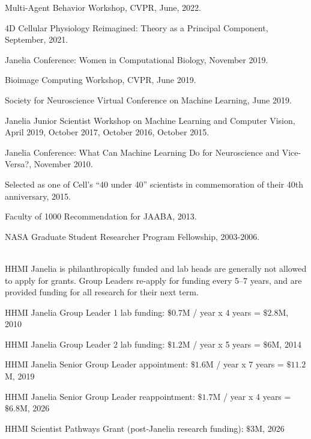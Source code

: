 \documentclass[11pt, letterpaper]{awesome-cv}
\begin{document}
\vspace{\acvSectionContentTopSkip}
\vspace{2mm}
\begin{cvitems}
\item Multi-Agent Behavior Workshop, CVPR, June, 2022. 
\item 4D Cellular Physiology Reimagined: Theory as a Principal Component, September, 2021. 
\item Janelia Conference: Women in Computational Biology, November 2019.
\item Bioimage Computing Workshop, CVPR, June 2019.
\item Society for Neuroscience Virtual Conference on Machine Learning, June 2019.
\item Janelia Junior Scientist Workshop on Machine Learning and Computer Vision, April 2019, October 2017, October 2016, October 2015.
\item Janelia Conference: What Can Machine Learning Do for Neuroscience and Vice-Versa?, November 2010.
\end{cvitems}
\vspace{\acvSectionContentTopSkip}

\vspace{\acvSectionContentTopSkip}
\vspace{2mm}
\begin{cvitems}
\item Selected as one of Cell’s ``40 under 40'' scientists in commemoration of their 40th anniversary, 2015.
\item Faculty of 1000 Recommendation for JAABA, 2013.
\item NASA Graduate Student Researcher Program Fellowship, 2003-2006.
\end{cvitems}
\vspace{\acvSectionContentTopSkip}

\vspace{\acvSectionContentTopSkip}\\
HHMI Janelia is philanthropically funded and lab heads are generally not allowed to apply for grants. Group Leaders re-apply for funding every 5--7 years, and are provided funding for all research for their next term. 
\vspace{4mm}
\begin{cvitems}
\item HHMI Janelia Group Leader 1 lab funding: $\$0.7$M / year x 4 years = $\$2.8$M, 2010
\item HHMI Janelia Group Leader 2 lab funding: $\$1.2$M / year x 5 years = $\$6$M, 2014
\item HHMI Janelia Senior Group Leader appointment: $\$1.6$M / year x 7 years = $\$11.2$M, 2019
\item HHMI Janelia Senior Group Leader reappointment: $\$1.7$M / year x 4 years = $\$6.8$M, 2026
\item HHMI Scientist Pathways Grant (post-Janelia research funding): $\$3$M, 2026
\end{cvitems}
\vspace{\acvSectionContentTopSkip}
\end{document}
